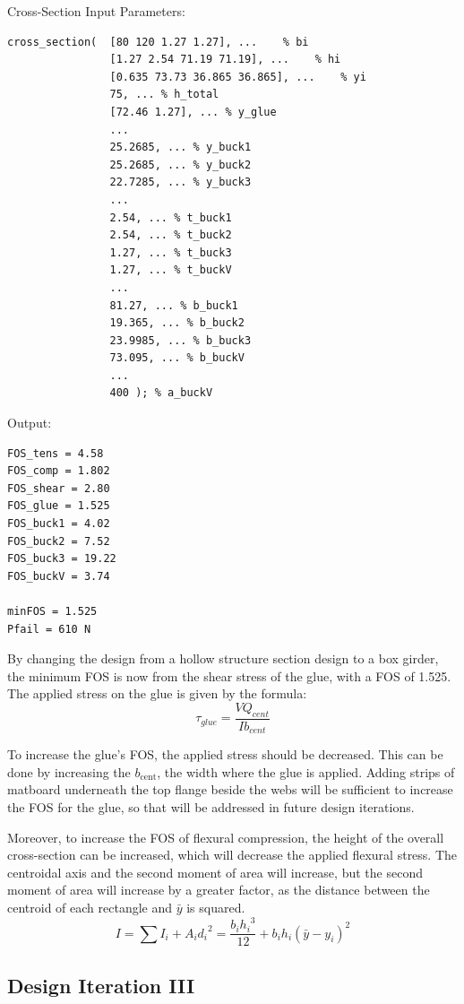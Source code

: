 \documentclass[11pt]{article}
\begin{document}
Cross-Section Input Parameters:
\begin{lstlisting}[]
cross_section(  [80 120 1.27 1.27], ...    % bi
                [1.27 2.54 71.19 71.19], ...    % hi
                [0.635 73.73 36.865 36.865], ...    % yi
                75, ... % h_total 
                [72.46 1.27], ... % y_glue
                ...
                25.2685, ... % y_buck1
                25.2685, ... % y_buck2
                22.7285, ... % y_buck3
                ...
                2.54, ... % t_buck1
                2.54, ... % t_buck2
                1.27, ... % t_buck3
                1.27, ... % t_buckV
                ...
                81.27, ... % b_buck1
                19.365, ... % b_buck2
                23.9985, ... % b_buck3
                73.095, ... % b_buckV
                ...
                400 ); % a_buckV
\end{lstlisting}

Output:
\begin{lstlisting}[]
FOS_tens = 4.58
FOS_comp = 1.802
FOS_shear = 2.80
FOS_glue = 1.525
FOS_buck1 = 4.02
FOS_buck2 = 7.52
FOS_buck3 = 19.22
FOS_buckV = 3.74

minFOS = 1.525
Pfail = 610 N
\end{lstlisting}

By changing the design from a hollow structure section design to a box girder, the minimum FOS is now from the shear stress of the glue, with a FOS of 1.525. The applied stress on the glue is given by the formula:
\[\tau_{glue}=\frac{VQ_{cent}}{Ib_{cent}}\]

To increase the glue's FOS, the applied stress should be decreased. This can be done by increasing the $b_\mathrm{cent}$, the width where the glue is applied. Adding strips of matboard underneath the top flange beside the webs will be sufficient to increase the FOS for the glue, so that will be addressed in future design iterations.

Moreover, to increase the FOS of flexural compression, the height of the overall cross-section can be increased, which will decrease the applied flexural stress. The centroidal axis and the second moment of area will increase, but the second moment of area will increase by a greater factor, as the distance between the centroid of each rectangle and $\bar{y}$ is squared.
\[I=\sum{I_i+A_i{d_i}^2}=\frac{b_i{h_i}^3}{12}+b_ih_i\left(\bar{y}-y_i\right)^2\]

\subsection{Design Iteration III}
\end{document}
